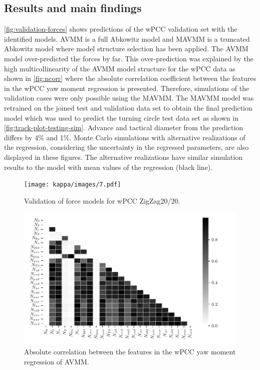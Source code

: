 \subsection*{Results and main findings}
\autoref{fig:validation-forces} shows predictions of the wPCC validation set with the identified models. AVMM is a full Abkowitz model and MAVMM is a truncated Abkowitz model where model structure selection has been applied. The AVMM model over-predicted the forces by far. 
This over-prediction was  explained by the high multicollinearity of the AVMM model structure for the wPCC data as shown in \autoref{fig:ncorr}  where the absolute correlation coefficient between the features in the wPCC yaw moment regression is presented.
Therefore, simulations of the validation cases were only possible using the MAVMM. 
The MAVMM model was retrained on the joined test and validation data set to obtain the final prediction model which was used to predict the turning circle test data set as shown in \autoref{fig:track-plot-testing-sim}. Advance and tactical diameter \cite{imoStandardsShipManoeuvrability2002} from the prediction differs by 4\% and 1\%. Monte Carlo simulations with alternative realizations of the regression, considering the uncertainty in the regressed parameters, are also displayed in these figures. The alternative realizations have similar simulation results to the model with mean values of the regression (black line).
\begin{figure}[h]
\centering
\texttt{[image: kappa/images/7.pdf]}
\caption{Validation of force models for wPCC ZigZag20/20.}\label{fig:validation-forces}
\end{figure}
\begin{figure}[h]
\centering
\includegraphics[width=1.0\textwidth]{kappa/images/10.pdf}

    \caption{Absolute correlation between the features in the wPCC yaw moment regression of AVMM.}

\label{fig:ncorr}
\end{figure}
